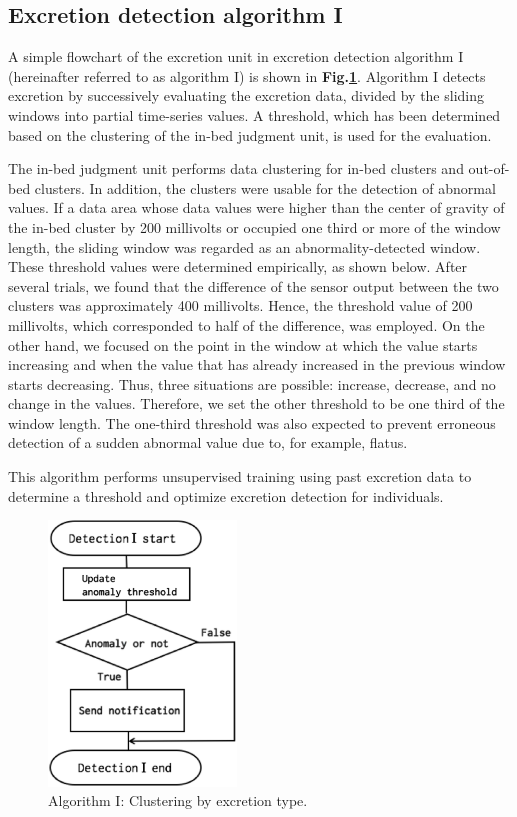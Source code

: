 \documentclass[publish,JRM,paper]{jaciiiarticle}
\begin{document}
\subsection{Excretion detection algorithm I}
A simple flowchart of the excretion unit in excretion detection algorithm I (hereinafter referred to as algorithm I) is shown in {\bf Fig.\ref{cluster1}}. Algorithm I detects excretion by successively evaluating the excretion data, divided by the sliding windows into partial time-series values. A threshold, which has been determined based on the clustering of the in-bed judgment unit, is used for the evaluation.

The in-bed judgment unit performs data clustering for in-bed clusters and out-of-bed clusters. In addition, the clusters were usable for the detection of abnormal values. If a data area whose data values were higher than the center of gravity of the in-bed cluster by 200 millivolts or occupied one third or more of the window length, the sliding window was regarded as an abnormality-detected window. These threshold values were determined empirically, as shown below. After several trials, we found that the difference of the sensor output between the two clusters was approximately 400 millivolts. Hence, the threshold value of 200 millivolts, which corresponded to half of the difference, was employed. On the other hand, we focused on the point in the window at which the value starts increasing and when the value that has already increased in the previous window starts decreasing. Thus, three situations are possible: increase, decrease, and no change in the values. Therefore, we set the other threshold to be one third of the window length. The one-third threshold was also expected to prevent erroneous detection of a sudden abnormal value due to, for example, flatus.

This algorithm performs unsupervised training using past excretion data to determine a threshold and optimize excretion detection for individuals.

\begin{figure}[t]
\centering
\includegraphics[width=5cm]{./fig/detection1.eps}
\caption{Algorithm I: Clustering by excretion type.}
\label{cluster1}
\end{figure}
\end{document}
